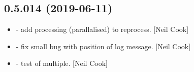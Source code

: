\documentclass[a4paper,10pt,english]{report}
\begin{document}
\subsection{0.5.014 (2019-06-11)}
\label{\detokenize{misc/changelog:id122}}\begin{itemize}
\item {} 
 - add processing (parallalised) to reprocess. {[}Neil
Cook{]}

\item {} 
 - fix small bug with position of log message. {[}Neil
Cook{]}

\item {} 
 - test of multiple. {[}Neil Cook{]}

\end{itemize}
\end{document}
